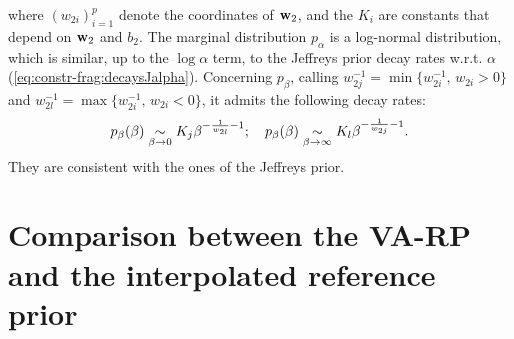where $(w_{2i})_{i=1}^p$ denote the coordinates of $\mathbf{w}_2$, and the $K_i$ are constants that depend on $\mathbf{w}_2$ and $b_2$. 
The marginal distribution $p_\alpha$ is a log-normal distribution, which is similar, up to the $\log \alpha$ term, to the Jeffreys prior decay rates w.r.t. $\alpha$ (\cref{eq:constr-frag:decaysJalpha}).  Concerning $p_\beta$, calling $w_{2j}^{-1}=\min\{w_{2i}^{-1},\,w_{2i}>0\}$ and $w_{2l}^{-1}=\max\{w_{2i}^{-1},\,w_{2i}<0\}$, 
it admits the following decay rates:
\begin{equation}
    p_\beta(\beta)\underset{\beta\rightarrow0}{\sim} K_j\beta^{-\frac{1}{w_{2l}}-1};\quad p_\beta(\beta)\underset{\beta\rightarrow\infty}{\sim} K_l\beta^{-\frac{1}{w_{2j}}-1}.
    \label{eq:palphabeta}
\end{equation}
They are consistent with the ones of the Jeffreys prior. %























\section{Comparison between the VA-RP and the interpolated reference prior}\label{sec:constr-frags:coparisonpriors}



